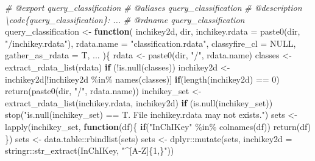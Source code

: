 \documentclass[
]{article}
\newenvironment{Shaded}{\begin{snugshade}}{\end{snugshade}}
\newcommand{\AttributeTok}[1]{\textcolor[rgb]{0.77,0.63,0.00}{#1}}
\newcommand{\CommentTok}[1]{\textcolor[rgb]{0.56,0.35,0.01}{\textit{#1}}}
\newcommand{\ConstantTok}[1]{\textcolor[rgb]{0.00,0.00,0.00}{#1}}
\newcommand{\ControlFlowTok}[1]{\textcolor[rgb]{0.13,0.29,0.53}{\textbf{#1}}}
\newcommand{\DecValTok}[1]{\textcolor[rgb]{0.00,0.00,0.81}{#1}}
\newcommand{\FunctionTok}[1]{\textcolor[rgb]{0.00,0.00,0.00}{#1}}
\newcommand{\NormalTok}[1]{#1}
\newcommand{\OtherTok}[1]{\textcolor[rgb]{0.56,0.35,0.01}{#1}}
\newcommand{\SpecialCharTok}[1]{\textcolor[rgb]{0.00,0.00,0.00}{#1}}
\newcommand{\StringTok}[1]{\textcolor[rgb]{0.31,0.60,0.02}{#1}}
\begin{document}
\begin{Shaded}
\begin{Highlighting}[]
\CommentTok{\#\textquotesingle{} @export query\_classification}
\CommentTok{\#\textquotesingle{} @aliases query\_classification}
\CommentTok{\#\textquotesingle{} @description \textbackslash{}code\{query\_classification\}: ...}
\CommentTok{\#\textquotesingle{} @rdname query\_classification}
\NormalTok{query\_classification }\OtherTok{\textless{}{-}} 
  \ControlFlowTok{function}\NormalTok{(}
\NormalTok{    inchikey2d,}
\NormalTok{    dir,}
    \AttributeTok{inchikey.rdata =} \FunctionTok{paste0}\NormalTok{(dir, }\StringTok{"/inchikey.rdata"}\NormalTok{),}
    \AttributeTok{rdata.name =} \StringTok{"classification.rdata"}\NormalTok{,}
    \AttributeTok{classyfire\_cl =} \ConstantTok{NULL}\NormalTok{,}
    \AttributeTok{gather\_as\_rdata =}\NormalTok{ T,}
\NormalTok{    ...}
\NormalTok{    )\{}
\NormalTok{    rdata }\OtherTok{\textless{}{-}} \FunctionTok{paste0}\NormalTok{(dir, }\StringTok{"/"}\NormalTok{, rdata.name)}
\NormalTok{    classes }\OtherTok{\textless{}{-}} \FunctionTok{extract\_rdata\_list}\NormalTok{(rdata)}
    \ControlFlowTok{if}\NormalTok{ (}\SpecialCharTok{!}\FunctionTok{is.null}\NormalTok{(classes))}
\NormalTok{      inchikey2d }\OtherTok{\textless{}{-}}\NormalTok{ inchikey2d[}\SpecialCharTok{!}\NormalTok{inchikey2d }\SpecialCharTok{\%in\%} \FunctionTok{names}\NormalTok{(classes)]}
    \ControlFlowTok{if}\NormalTok{(}\FunctionTok{length}\NormalTok{(inchikey2d) }\SpecialCharTok{==} \DecValTok{0}\NormalTok{)}
      \FunctionTok{return}\NormalTok{(}\FunctionTok{paste0}\NormalTok{(dir, }\StringTok{"/"}\NormalTok{, rdata.name))}
\NormalTok{    inchikey\_set }\OtherTok{\textless{}{-}} \FunctionTok{extract\_rdata\_list}\NormalTok{(inchikey.rdata, inchikey2d)}
    \ControlFlowTok{if}\NormalTok{ (}\FunctionTok{is.null}\NormalTok{(inchikey\_set))}
      \FunctionTok{stop}\NormalTok{(}\StringTok{"is.null(inchikey\_set) == T. File \textasciigrave{}inchikey.rdata\textasciigrave{} may not exists."}\NormalTok{)}
\NormalTok{    sets }\OtherTok{\textless{}{-}} \FunctionTok{lapply}\NormalTok{(inchikey\_set, }\ControlFlowTok{function}\NormalTok{(df)\{}
      \ControlFlowTok{if}\NormalTok{(}\StringTok{"InChIKey"} \SpecialCharTok{\%in\%} \FunctionTok{colnames}\NormalTok{(df))}
        \FunctionTok{return}\NormalTok{(df)}
\NormalTok{    \})}
\NormalTok{    sets }\OtherTok{\textless{}{-}}\NormalTok{ data.table}\SpecialCharTok{::}\FunctionTok{rbindlist}\NormalTok{(sets)}
\NormalTok{    sets }\OtherTok{\textless{}{-}}\NormalTok{ dplyr}\SpecialCharTok{::}\FunctionTok{mutate}\NormalTok{(sets, }\AttributeTok{inchikey2d =}\NormalTok{ stringr}\SpecialCharTok{::}\FunctionTok{str\_extract}\NormalTok{(InChIKey, }\StringTok{"\^{}[A{-}Z]\{1,\}"}\NormalTok{))}

\end{Highlighting}
\end{Shaded}
\end{document}
